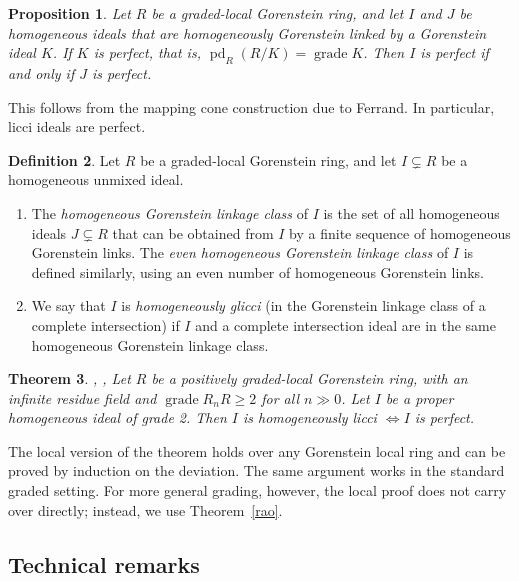 \documentclass[11pt,letterpaper]{amsart}
\DeclareMathOperator{\gr}{grade}
\theoremstyle{plain}
\newtheorem{thm}{Theorem}[section]
\newtheorem{prop}[thm]{Proposition}
\theoremstyle{definition}
\newtheorem{defi}[thm]{Definition}
\theoremstyle{remark}
\begin{document}
\begin{prop}\cite{peskine1974liaison}
    Let $R$ be a graded-local Gorenstein ring, and let $I$ and $J$ be homogeneous ideals that are homogeneously Gorenstein linked by a Gorenstein ideal $K$. If $K$ is perfect, that is, $\operatorname{pd}_R(R/K)=\gr K
    $. Then $I$ is perfect if and only if $J$ is perfect.
\end{prop}
This follows from the mapping cone construction due to Ferrand. In particular, licci ideals are perfect. 

\begin{defi}
Let \(R\) be a graded-local Gorenstein ring, and let \(I\subsetneq R\) be a homogeneous unmixed ideal.

\begin{enumerate}
\item[(a)] The \emph{homogeneous Gorenstein linkage class} of \(I\) is the set of all homogeneous ideals \(J\subsetneq R\) that can be obtained from \(I\) by a finite sequence of homogeneous Gorenstein links. The \emph{even homogeneous Gorenstein linkage class} of \(I\) is defined similarly, using an even number of homogeneous Gorenstein links.

\item[(b)] We say that \(I\) is \emph{homogeneously glicci} (in the Gorenstein linkage class of a complete intersection) if \(I\) and a complete intersection ideal are in the same homogeneous Gorenstein linkage class.
\end{enumerate}
\end{defi}



\begin{thm} \cite{apery1945courbes}, \cite{gaeta1952quelques},\cite[Theorem~3.2]{peskine1974liaison}
    Let $R$ be a positively graded-local Gorenstein ring, with an infinite residue field and $\gr R_nR\ge 2$ for all $n\gg0$. Let $I$ be a proper homogeneous ideal of grade 2. Then $I$ is homogeneously licci $\iff I$ is perfect.    
\end{thm}

The local version of the theorem holds over any Gorenstein local ring and can be proved by induction on the deviation. The same argument works in the standard graded setting. For more general grading, however, the local proof does not carry over directly; instead, we use Theorem~\ref{rao}.

\subsection{Technical remarks}
\end{document}
